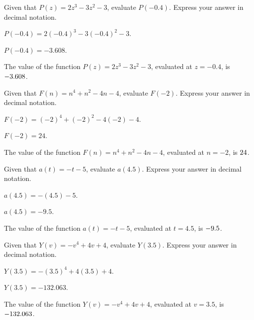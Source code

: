 \begin{shuffle}
\begin{exercise}
Given that $P(z)=2 z^3-3 z^2-3$, evaluate $P(-0.4)$. Express your answer in decimal notation.
\begin{solution}
\begin{hint}
$P(-0.4)=2 (-0.4)^3-3 (-0.4)^2-3$.
\end{hint}
\begin{hint}
$P(-0.4)=-3.608$.
\end{hint}
The value of the function $P(z)=2 z^3-3 z^2-3$, evaluated at $z=-0.4$, is ${-3.608}$.
\end{solution}
\end{exercise}

\begin{exercise}
Given that $F(n)=n^4+n^2-4 n-4$, evaluate $F(-2)$. Express your answer in decimal notation.
\begin{solution}
\begin{hint}
$F(-2)=(-2)^4+(-2)^2-4 (-2)-4$.
\end{hint}
\begin{hint}
$F(-2)=24$.
\end{hint}
The value of the function $F(n)=n^4+n^2-4 n-4$, evaluated at $n=-2$, is ${24}$.
\end{solution}
\end{exercise}

\begin{exercise}
Given that $a(t)=-t-5$, evaluate $a(4.5)$. Express your answer in decimal notation.
\begin{solution}
\begin{hint}
$a(4.5)=-(4.5)-5$.
\end{hint}
\begin{hint}
$a(4.5)=-9.5$.
\end{hint}
The value of the function $a(t)=-t-5$, evaluated at $t=4.5$, is ${-9.5}$.
\end{solution}
\end{exercise}

\begin{exercise}
Given that $Y(v)=-v^4+4 v+4$, evaluate $Y(3.5)$. Express your answer in decimal notation.
\begin{solution}
\begin{hint}
$Y(3.5)=-(3.5)^4+4 (3.5)+4$.
\end{hint}
\begin{hint}
$Y(3.5)=-132.063$.
\end{hint}
The value of the function $Y(v)=-v^4+4 v+4$, evaluated at $v=3.5$, is ${-132.063}$.
\end{solution}
\end{exercise}


\end{shuffle}
